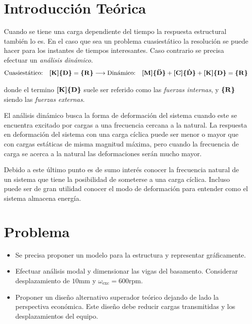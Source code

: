\documentclass[onecolumn,10pt,titlepage,a4paper]{article}
\begin{document}
\tableofcontents

\section{Introducción Teórica}
Cuando se tiene una carga dependiente del tiempo la respuesta estructural también lo es. En el caso que sea un problema cuasiestático la resolución se puede hacer para los instantes de tiempos interesantes. Caso contrario se precisa efectuar un \textit{análisis dinámico}.
\begin{equation} \label{eq:FuerzasDinamicas}
	\text{Cuasiestático:}\quad \boldsymbol{[}\mathbf{K} \boldsymbol{]}\boldsymbol{\{ }\mathbf{D} \boldsymbol{\}} = \boldsymbol{\{ }\mathbf{R} \boldsymbol{\}} \longrightarrow \text{Dinámico:} \quad 
	\boldsymbol{[}\mathbf{M} \boldsymbol{]} \boldsymbol{\{ }\mathbf{\ddot{D}} \boldsymbol{\}} + \boldsymbol{[}\mathbf{C} \boldsymbol{]}\boldsymbol{\{ }\mathbf{\dot{D}} \boldsymbol{\}} + \boldsymbol{[}\mathbf{K} \boldsymbol{]}\boldsymbol{\{ }\mathbf{D} \boldsymbol{\}} = \boldsymbol{\{ }\mathbf{R} \boldsymbol{\}}
\end{equation}
	

donde el termino $\boldsymbol{[}\mathbf{K} \boldsymbol{]}\boldsymbol{\{ }\mathbf{D} \boldsymbol{\}}$ suele ser referido como las \textit{fuerzas internas}, y $\boldsymbol{\{ }\mathbf{R} \boldsymbol{\}}$ siendo las \textit{fuerzas externas}.

El análisis dinámico busca la forma de deformación del sistema cuando este se encuentra excitado por cargas a una frecuencia cercana a la natural. La respuesta en deformación del sistema con una carga cíclica puede ser menor o mayor que con cargas estáticas de misma magnitud máxima, pero cuando la frecuencia de carga se acerca a la natural las deformaciones serán mucho mayor. 

Debido a este último punto es de sumo interés conocer la frecuencia natural de un sistema que tiene la posibilidad de someterse a una carga cíclica. Incluso puede ser de gran utilidad conocer el modo de deformación para entender como el sistema almacena energía.


\setcounter{section}{0}
\section{Problema}

\begin{itemize}
	\item Se precisa proponer un modelo para la estructura y representar gráficamente.
	\item Efectuar análisis modal y dimensionar las vigas del basamento. Considerar desplazamiento de $10$mm y $\omega_{\mathrm{exc}}=600\mathrm{rpm}$.
	\item Proponer un diseño alternativo superador teórico dejando de lado la perspectiva económica. Este diseño debe reducir cargas transmitidas y los desplazamientos del equipo.
\end{itemize}
\end{document}
